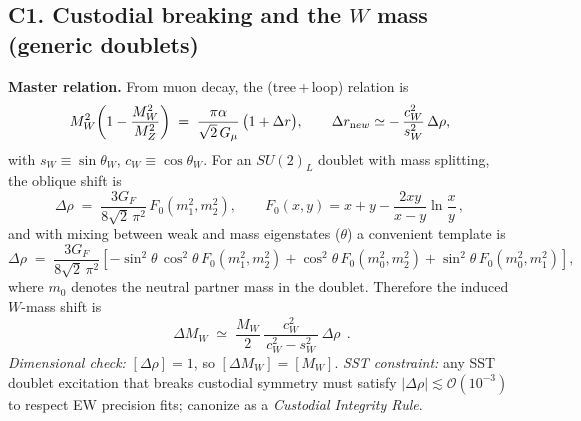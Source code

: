 \documentclass[11pt]{article}
\begin{document}
      \subsection*{C1. Custodial breaking and the $W$ mass (generic doublets)}
          \textbf{Master relation.} From muon decay, the (tree\,+\,loop) relation is
          \begin{equation}
          M_W^2\!\left(1-\frac{M_W^2}{M_Z^2}\right)
          \;=\; \frac{\pi\alpha}{\sqrt{2}\,G_\mu}\,\bigl(1+\Delta r\bigr),
          \qquad
          \Delta r_{\textrm new}\simeq -\,\frac{c_W^2}{s_W^2}\,\Delta\rho,
          \label{eq:MWmaster}
          \end{equation}
          with $s_W\equiv\sin\theta_W$, $c_W\equiv\cos\theta_W$. For an $SU(2)_L$ doublet with mass splitting, the oblique shift is
          \begin{equation}
          \Delta\rho \;=\; \frac{3G_F}{8\sqrt{2}\,\pi^2}\,F_0(m_1^2,m_2^2),
          \qquad
          F_0(x,y)=x+y-\frac{2xy}{x-y}\ln\!\frac{x}{y}\,,
          \end{equation}
          and with mixing between weak and mass eigenstates ($\theta$) a convenient template is
          \begin{equation}
          \Delta\rho \;=\; \frac{3G_F}{8\sqrt{2}\,\pi^2}\!
          \left[
              -\sin^2\theta\,\cos^2\theta\,F_0(m_1^2,m_2^2)
          + \cos^2\theta\,F_0(m_0^2,m_2^2)
          + \sin^2\theta\,F_0(m_0^2,m_1^2)
          \right]\!,
          \end{equation}
          where $m_0$ denotes the neutral partner mass in the doublet.
          Therefore the induced $W$-mass shift is
          \begin{equation}
          \boxed{\;\Delta M_W \;\simeq\; \frac{M_W}{2}\,
          \frac{c_W^2}{\,c_W^2-s_W^2\,}\,\Delta\rho\;}\,.
          \end{equation}
          \textit{Dimensional check:} $[\Delta\rho]=1$, so $[\Delta M_W]=[M_W]$. \textit{SST constraint:} any SST doublet excitation that breaks custodial symmetry must satisfy $|\Delta\rho|\lesssim \mathcal O(10^{-3})$ to respect EW precision fits; canonize as a \emph{Custodial Integrity Rule}.
\end{document}
